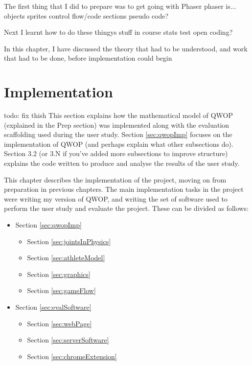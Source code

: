 \documentclass[12pt,a4paper,twoside,openright]{report}
\begin{document}
The first thing that I did to prepare was to get going with Phaser
phaser is...
	objects sprites
	control flow/code sections
		pseudo code?

Next I learnt how to do these thingys
stuff in course
	stats test
	open coding?

In this chapter, I have discussed the theory that had to be understood, and work that
had to be done, before implementation could begin




\chapter{Implementation}
todo: fix thish
This section explains how the mathematical model of QWOP (explained in the Prep section) was implemented along with the evaluation scaffolding used during the user study.  Section \ref{sec:qwopImp} focuses on the implementation of QWOP (and perhaps explain what other subsections do). Section 3.2 (or 3.N if you've added more subsections to improve structure) explains the code written to produce and analyse the results of the user study.

This chapter describes the implementation of the project, moving on from preparation in previous chapters. The main implementation tasks in the project were writing my version of QWOP, and writing the set of software used to perform the user study and evaluate the project. These can be divided as follows:

\begin{itemize}
  \item Section \ref{sec:qwopImp} 
	\begin{itemize}
      \item Section \ref{sec:jointsInPhysics} 
  	  \item Section \ref{sec:athleteModel} 
  	  \item Section \ref{sec:graphics} 
  	  \item Section \ref{sec:gameFlow} 
	\end{itemize}
  \item Section \ref{sec:evalSoftware} 
   \begin{itemize}
      \item Section \ref{sec:webPage} 
      \item Section \ref{sec:serverSoftware} 
      \item Section \ref{sec:chromeExtension} 
    \end{itemize}
\end{itemize}
\end{document}
